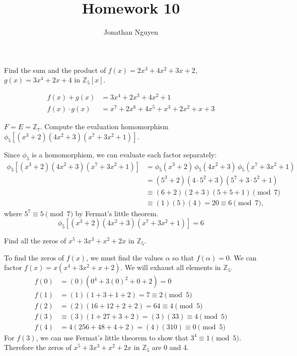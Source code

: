 \documentclass[11pt]{article}
\title{Homework 10}
\author{Jonathan Nguyen}
\begin{document}
\begin{problem}[22.4]
Find the sum and the product of $f(x) = 2x^3 + 4x^2 + 3x + 2$,
$g(x) = 3x^4 + 2x + 4$ in $\mathbb{Z}_5[x]$.
\end{problem}

\begin{solution}
\begin{align*}
    f(x) + g(x) &= 3x^4 + 2x^3 + 4x^2 + 1 \\
    f(x) \cdot g(x) &= x^7 + 2x^6 + 4x^5 + x^3 + 2x^2 + x + 3
\end{align*}
\end{solution}

\begin{problem}[22.10]
$F = E = \mathbb{Z}_7$. Compute the evaluation homomorphism
$\phi_5[(x^3 + 2)(4x^2 + 3)(x^7 + 3x^2 + 1)]$.
\end{problem}

\begin{solution}
Since $\phi_5$ is a homomorphism, we can evaluate each factor separately:
\begin{align*}
\phi_5[(x^3 + 2)(4x^2 + 3)(x^7 + 3x^2 + 1)]
&= \phi_5(x^3 + 2)\,\phi_5(4x^2 + 3)\,\phi_5(x^7 + 3x^2 + 1) \\
&= (5^3 + 2)(4 \cdot 5^2 + 3)(5^7 + 3 \cdot 5^2 + 1) \\
&\equiv (6 + 2)(2 + 3)(5 + 5 + 1) \pmod{7} \\
&\equiv (1)(5)(4) = 20 \equiv 6 \pmod{7},
\end{align*}
where $5^7 \equiv 5 \pmod{7}$ by Fermat's little theorem.
\[
\boxed{\phi_5[(x^3 + 2)(4x^2 + 3)(x^7 + 3x^2 + 1)] = 6}
\]
\end{solution}

\begin{problem}[22.14]
Find all the zeros of $x^5 + 3x^3 + x^2 + 2x$ in $\mathbb{Z}_5$.
\end{problem}

\begin{solution}
To find the zeros of $f(x)$, we must find the values $\alpha$ so that
$f(\alpha) = 0$.
We can factor $f(x) = x(x^4 + 3x^2 + x + 2)$.
We will exhaust all elements in $\mathbb{Z}_5$.
\begin{align*}
    f(0) &= (0)(0^4 + 3(0)^2 + 0 + 2) = 0 \\
    f(1) &= (1)(1 + 3 + 1 + 2) = 7 \equiv 2 \pmod{5} \\
    f(2) &= (2)(16 + 12 + 2 + 2) = 64 \equiv 4 \pmod{5} \\
    f(3) &\equiv (3)(1 + 27 + 3 + 2) = (3)(33) \equiv 4 \pmod{5} \\
    f(4) &= 4(256 + 48 + 4 + 2) = (4)(310) \equiv 0 \pmod{5}
\end{align*}
For $f(3)$, we can use Fermat's little theorem to show that
$3^4 \equiv 1 \pmod{5}$.
Therefore the zeros of $x^5 + 3x^3 + x^2 + 2x$ in $\mathbb{Z}_5$ are 0 and 4.
\end{solution}
\end{document}
